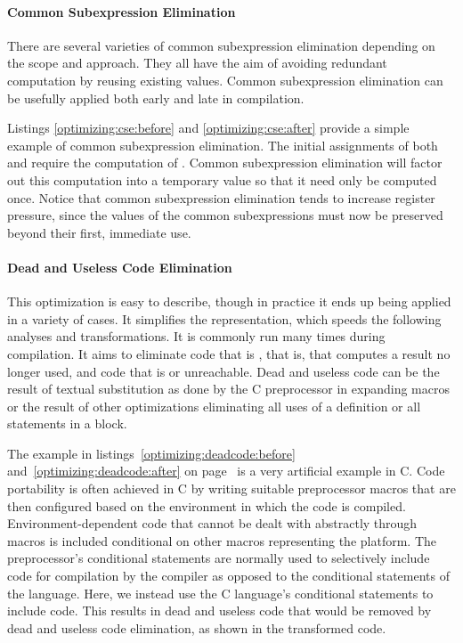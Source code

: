 \paragraph{Common Subexpression Elimination}
There are several varieties of common subexpression elimination depending on the scope and approach. They all have the aim of avoiding redundant computation by reusing existing values. Common subexpression elimination can be usefully applied both early and late in compilation.

Listings \ref{optimizing:cse:before} and \ref{optimizing:cse:after} provide a simple example of common subexpression elimination. The initial assignments of both  and  require the computation of . Common subexpression elimination will factor out this computation into a temporary value so that it need only be computed once. Notice that common subexpression elimination tends to increase register pressure, since the values of the common subexpressions must now be preserved beyond their first, immediate use.





\paragraph{Dead and Useless Code Elimination}
This optimization is easy to describe, though in practice it ends up being applied in a variety of cases. It simplifies the representation, which speeds the following analyses and transformations. It is commonly run many times during compilation. It aims to eliminate code that is , that is, that computes a result no longer used, and code that is  or unreachable. Dead and useless code can be the result of textual substitution as done by the C preprocessor in expanding macros or the result of other optimizations eliminating all uses of a definition or all statements in a block.

The example in listings~\ref{optimizing:deadcode:before} and~\ref{optimizing:deadcode:after} on page~\pageref{optimizing:deadcode:before} is a very artificial example in C. Code portability is often achieved in C by writing suitable preprocessor macros that are then configured based on the environment in which the code is compiled. Environment-dependent code that cannot be dealt with abstractly through macros is included conditional on other macros representing the platform. The preprocessor's conditional statements are normally used to selectively include code for compilation by the compiler as opposed to the conditional statements of the language. Here, we instead use the C language's conditional statements to include code. This results in dead and useless code that would be removed by dead and useless code elimination, as shown in the transformed code.

